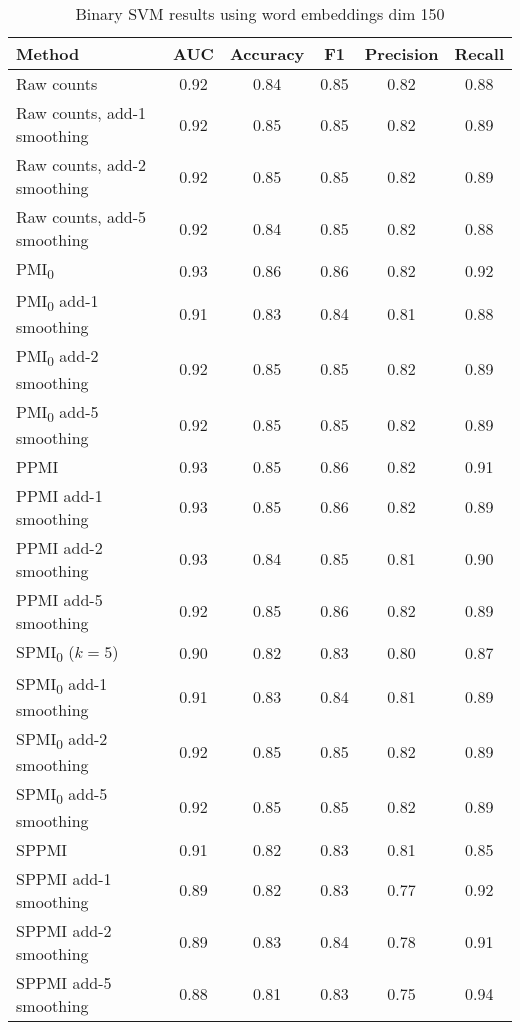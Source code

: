 \documentclass{article}
\begin{document}
\begin{table}[htp]
 \caption{Binary SVM results using word embeddings dim 150}
  \centering
  \begin{tabular}{|l|c|c|c|c|c|}
    \hline
    \rowcolor{lightgray} \textbf{Method} & \textbf{AUC} & \textbf{Accuracy} & \textbf{F1} & \textbf{Precision} & \textbf{Recall} \\
    \hline
    Raw counts & 0.92 & 0.84 & 0.85 & \cellcolor{green} 0.82 & 0.88 \\
    \hline
    Raw counts, add-1 smoothing & 0.92 & 0.85 & 0.85 & \cellcolor{green} 0.82 & 0.89 \\
    \hline
    Raw counts, add-2 smoothing & 0.92 & 0.85 & 0.85 & \cellcolor{green} 0.82 & 0.89 \\
    \hline
    Raw counts, add-5 smoothing & 0.92 & 0.84 & 0.85 & \cellcolor{green} 0.82 & 0.88 \\
    \hline
    \cellcolor{green} PMI\textsubscript{0} & \cellcolor{green} 0.93 & \cellcolor{green} 0.86 & \cellcolor{green} 0.86 & \cellcolor{green} 0.82 & 0.92 \\
    \hline
    PMI\textsubscript{0} add-1 smoothing & 0.91 & 0.83 & 0.84 & 0.81 & 0.88 \\
    \hline
    PMI\textsubscript{0} add-2 smoothing & 0.92 & 0.85 & 0.85 & \cellcolor{green} 0.82 & 0.89 \\
    \hline
    PMI\textsubscript{0} add-5 smoothing & 0.92 & 0.85 & 0.85 & \cellcolor{green} 0.82 & 0.89 \\
    \hline
    PPMI & \cellcolor{green} 0.93 & 0.85 & \cellcolor{green} 0.86 & \cellcolor{green} 0.82 & 0.91 \\
    \hline
    PPMI add-1 smoothing & \cellcolor{green} 0.93 & 0.85 & \cellcolor{green} 0.86 & \cellcolor{green} 0.82 & 0.89 \\
    \hline
    PPMI add-2 smoothing & \cellcolor{green} 0.93 & 0.84 & 0.85 & 0.81 & 0.90 \\
    \hline
    PPMI add-5 smoothing & 0.92 & 0.85 & 0.86 & \cellcolor{green} 0.82 & 0.89 \\
    \hline
    SPMI\textsubscript{0} ($k=5$) & 0.90 & 0.82 & 0.83 & 0.80 & 0.87 \\
    \hline
    SPMI\textsubscript{0} add-1 smoothing & 0.91 & 0.83 & 0.84 & 0.81 & 0.89 \\
    \hline
    SPMI\textsubscript{0} add-2 smoothing & 0.92 & 0.85 & 0.85 & \cellcolor{green} 0.82 & 0.89 \\
    \hline
    SPMI\textsubscript{0} add-5 smoothing & 0.92 & 0.85 & 0.85 & \cellcolor{green} 0.82 & 0.89 \\
    \hline
    SPPMI & 0.91 & 0.82 & 0.83 & 0.81 & 0.85 \\
    \hline
    SPPMI add-1 smoothing & 0.89 & 0.82 & 0.83 & 0.77 & 0.92 \\
    \hline
    SPPMI add-2 smoothing & 0.89 & 0.83 & 0.84 & 0.78 & 0.91 \\
    \hline
    SPPMI add-5 smoothing & 0.88 & 0.81 & 0.83 & 0.75 & \cellcolor{green} 0.94 \\
    \hline
  \end{tabular}
  \label{tab:wemb150}
\end{table}
\end{document}
